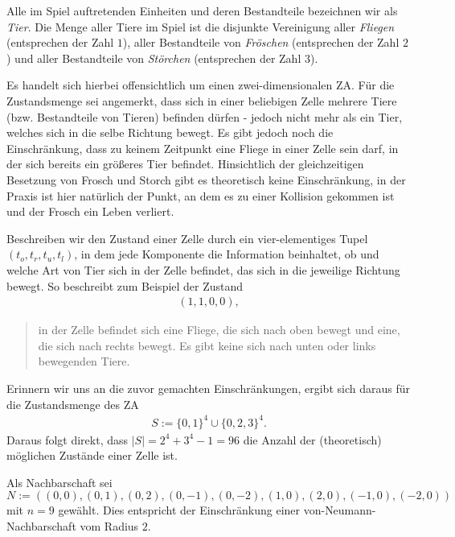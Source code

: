 \begin{definition}
  Alle im Spiel auftretenden Einheiten und deren Bestandteile bezeichnen wir als \textit{Tier}. Die Menge aller Tiere im Spiel ist die disjunkte Vereinigung aller \textit{Fliegen} (entsprechen der Zahl $1$), aller Bestandteile von \textit{Fröschen} (entsprechen der Zahl $2$) und aller Bestandteile von \textit{Störchen} (entsprechen der Zahl $3$).
\end{definition}

Es handelt sich hierbei offensichtlich um einen zwei-dimensionalen ZA. Für die Zustandsmenge sei angemerkt, dass sich in einer beliebigen Zelle mehrere Tiere (bzw. Bestandteile von Tieren) befinden dürfen - jedoch nicht mehr als ein Tier, welches sich in die selbe Richtung bewegt. Es gibt jedoch noch die Einschränkung, dass zu keinem Zeitpunkt eine Fliege in einer Zelle sein darf, in der sich bereits ein größeres Tier befindet. Hinsichtlich der gleichzeitigen Besetzung von Frosch und Storch gibt es theoretisch keine Einschränkung, in der Praxis ist hier natürlich der Punkt, an dem es zu einer Kollision gekommen ist und der Frosch ein Leben verliert.

Beschreiben wir den Zustand einer Zelle durch ein vier-elementiges Tupel $(t_o, t_r, t_u, t_l)$, in dem jede Komponente die Information beinhaltet, ob und welche Art von Tier sich in der Zelle befindet, das sich in die jeweilige Richtung bewegt. So beschreibt zum Beispiel der Zustand
\begin{align*}
  (1,1,0,0),
\end{align*}
\begin{quote} in der Zelle befindet sich eine Fliege, die sich nach oben bewegt und eine, die sich nach rechts bewegt. Es gibt keine sich nach unten oder links bewegenden Tiere. \end{quote}

Erinnern wir uns an die zuvor gemachten Einschränkungen, ergibt sich daraus für die Zustandsmenge des ZA
\begin{align*}
  S := \{0,1\}^4 \cup \{0,2,3\}^{4}.
\end{align*}
Daraus folgt direkt, dass $|S| = 2^4 + 3^4 -1 = 96$ die Anzahl der (theoretisch) möglichen Zustände einer Zelle ist.

Als Nachbarschaft sei $N := ((0,0), (0,1), (0,2), (0,-1), (0,-2), (1,0), (2,0), (-1,0), (-2,0))$ mit $n = 9$ gewählt. Dies entspricht der Einschränkung einer von-Neumann-Nachbarschaft vom Radius $2$.

